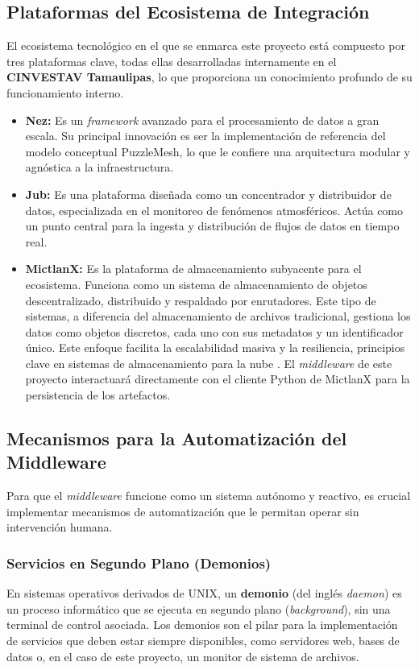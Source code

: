 \subsection{Plataformas del Ecosistema de Integración}
El ecosistema tecnológico en el que se enmarca este proyecto está compuesto por tres plataformas clave, todas ellas desarrolladas internamente en el \textbf{CINVESTAV Tamaulipas}, lo que proporciona un conocimiento profundo de su funcionamiento interno.
\begin{itemize}
    \item \textbf{Nez:} Es un \textit{framework} avanzado para el procesamiento de datos a gran escala. Su principal innovación es ser la implementación de referencia del modelo conceptual PuzzleMesh, lo que le confiere una arquitectura modular y agnóstica a la infraestructura.
    \item \textbf{Jub:} Es una plataforma diseñada como un concentrador y distribuidor de datos, especializada en el monitoreo de fenómenos atmosféricos. Actúa como un punto central para la ingesta y distribución de flujos de datos en tiempo real.
    \item \textbf{MictlanX:} Es la plataforma de almacenamiento subyacente para el ecosistema. Funciona como un sistema de almacenamiento de objetos descentralizado, distribuido y respaldado por enrutadores. Este tipo de sistemas, a diferencia del almacenamiento de archivos tradicional, gestiona los datos como objetos discretos, cada uno con sus metadatos y un identificador único. Este enfoque facilita la escalabilidad masiva y la resiliencia, principios clave en sistemas de almacenamiento para la nube \cite{pape2011object, kleppmann2017designing}. El \textit{middleware} de este proyecto interactuará directamente con el cliente Python de MictlanX para la persistencia de los artefactos.
\end{itemize}

\subsection{Mecanismos para la Automatización del Middleware}
Para que el \textit{middleware} funcione como un sistema autónomo y reactivo, es crucial implementar mecanismos de automatización que le permitan operar sin intervención humana.

\subsubsection{Servicios en Segundo Plano (Demonios)}
En sistemas operativos derivados de UNIX, un \textbf{demonio} (del inglés \textit{daemon}) es un proceso informático que se ejecuta en segundo plano (\textit{background}), sin una terminal de control asociada. Los demonios son el pilar para la implementación de servicios que deben estar siempre disponibles, como servidores web, bases de datos o, en el caso de este proyecto, un monitor de sistema de archivos. 

